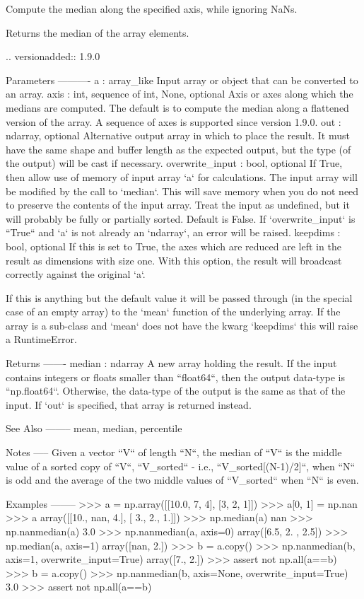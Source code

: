 \begin{DoxyVerb}Compute the median along the specified axis, while ignoring NaNs.

Returns the median of the array elements.

.. versionadded:: 1.9.0

Parameters
----------
a : array_like
    Input array or object that can be converted to an array.
axis : {int, sequence of int, None}, optional
    Axis or axes along which the medians are computed. The default
    is to compute the median along a flattened version of the array.
    A sequence of axes is supported since version 1.9.0.
out : ndarray, optional
    Alternative output array in which to place the result. It must
    have the same shape and buffer length as the expected output,
    but the type (of the output) will be cast if necessary.
overwrite_input : bool, optional
   If True, then allow use of memory of input array `a` for
   calculations. The input array will be modified by the call to
   `median`. This will save memory when you do not need to preserve
   the contents of the input array. Treat the input as undefined,
   but it will probably be fully or partially sorted. Default is
   False. If `overwrite_input` is ``True`` and `a` is not already an
   `ndarray`, an error will be raised.
keepdims : bool, optional
    If this is set to True, the axes which are reduced are left
    in the result as dimensions with size one. With this option,
    the result will broadcast correctly against the original `a`.

    If this is anything but the default value it will be passed
    through (in the special case of an empty array) to the
    `mean` function of the underlying array.  If the array is
    a sub-class and `mean` does not have the kwarg `keepdims` this
    will raise a RuntimeError.

Returns
-------
median : ndarray
    A new array holding the result. If the input contains integers
    or floats smaller than ``float64``, then the output data-type is
    ``np.float64``.  Otherwise, the data-type of the output is the
    same as that of the input. If `out` is specified, that array is
    returned instead.

See Also
--------
mean, median, percentile

Notes
-----
Given a vector ``V`` of length ``N``, the median of ``V`` is the
middle value of a sorted copy of ``V``, ``V_sorted`` - i.e.,
``V_sorted[(N-1)/2]``, when ``N`` is odd and the average of the two
middle values of ``V_sorted`` when ``N`` is even.

Examples
--------
>>> a = np.array([[10.0, 7, 4], [3, 2, 1]])
>>> a[0, 1] = np.nan
>>> a
array([[10., nan,  4.],
       [ 3.,  2.,  1.]])
>>> np.median(a)
nan
>>> np.nanmedian(a)
3.0
>>> np.nanmedian(a, axis=0)
array([6.5, 2. , 2.5])
>>> np.median(a, axis=1)
array([nan,  2.])
>>> b = a.copy()
>>> np.nanmedian(b, axis=1, overwrite_input=True)
array([7.,  2.])
>>> assert not np.all(a==b)
>>> b = a.copy()
>>> np.nanmedian(b, axis=None, overwrite_input=True)
3.0
>>> assert not np.all(a==b)\end{DoxyVerb}
